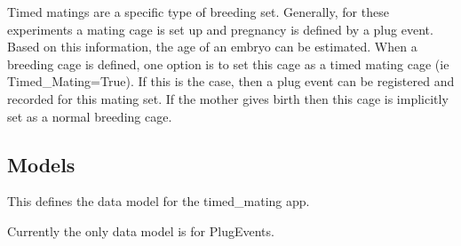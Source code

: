 \documentclass[letterpaper,10pt,english]{sphinxmanual}
\begin{document}
Timed matings are a specific type of breeding set.  
Generally, for these experiments a mating cage is set up and pregnancy is defined by a plug event.  
Based on this information, the age of an embryo can be estimated.  
When a breeding cage is defined, one option is to set this cage as a timed mating cage (ie Timed\_Mating=True).  
If this is the case, then a plug event can be registered and recorded for this mating set.  
If the mother gives birth then this cage is implicitly set as a normal breeding cage.



\subsection{Models}
\label{api:id6}\label{api:module-timed_mating.models}
This defines the data model for the timed\_mating app.


Currently the only data model is for PlugEvents.

\end{document}
